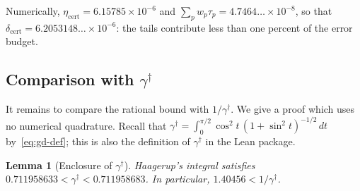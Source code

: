 \documentclass[11pt,reqno]{amsart}
\newtheorem{lemma}[theorem]{Lemma}
\theoremstyle{definition}
\numberwithin{equation}{section}
\newcommand{\gd}{\gamma^\dagger}
\newcommand{\dcert}{\delta_{\mathrm{cert}}}
\begin{document}
\smallskip
Numerically, $\eta_{\mathrm{cert}}=6.15785\times10^{-6}$ and $\sum_pw_p\tau_p=4.7464\ldots\times10^{-8}$, so that $\dcert=6.2053148\ldots\times10^{-6}$: the tails contribute less than one percent of the error budget.

\subsection{Comparison with \texorpdfstring{$\gd$}{gamma-dagger}}
It remains to compare the rational bound with $1/\gd$. We give a proof which uses no numerical quadrature. Recall that $\gd=\int_0^{\pi/2}\cos^2t\,(1+\sin^2t)^{-1/2}\,dt$ by~\eqref{eq:gd-def}; this is also the definition of $\gd$ in the Lean package.

\begin{lemma}[Enclosure of $\gd$]\label{lem:gd-upper}
Haagerup's integral satisfies $0.711958633 < \gd < 0.711958683$. In particular, $1.40456 < 1/\gd$.
\end{lemma}
\end{document}
